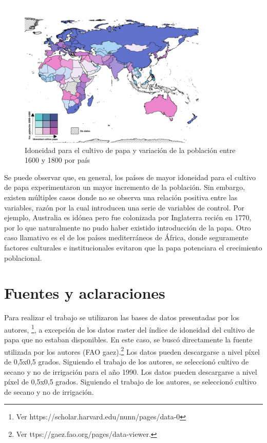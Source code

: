 \documentclass[10.5pt]{article}   %
\begin{document}
\begin{figure}[H]
\centering
\includegraphics[scale=0.6]{imgs/Map_bivariado_var_pob y papa_v2.png}
\caption{Idoneidad para el cultivo de papa y variación de la población entre 1600 y 1800 por país}
    \label{fig3}
\end{figure}

Se puede observar que, en general, los países de mayor idoneidad para el cultivo de papa experimentaron un mayor incremento de la población. Sin embargo, existen múltiples casos donde no se observa una relación positiva entre las variables, razón por la cual \cite{nunn2011potato} introducen una serie de variables de control. Por ejemplo, Australia es idónea pero fue colonizada por Inglaterra recién en 1770, por lo que naturalmente no pudo haber existido introducción de la papa. Otro caso llamativo es el de los países mediterráneos de África, donde seguramente factores culturales e institucionales evitaron que la papa potenciara el crecimiento poblacional.

\section*{Fuentes y aclaraciones}
Para realizar el trabajo se utilizaron las bases de datos presentadas por los autores, \footnote{Ver https://scholar.harvard.edu/nunn/pages/data-0}, a excepción de los datos raster del índice de idoneidad del cultivo de papa que no estaban disponibles. En este caso, se buscó directamente la fuente utilizada por los autores (FAO gaez).\footnote{Ver ttps://gaez.fao.org/pages/data-viewer.} Los datos pueden descargarse a nivel píxel de 0,5x0,5 grados. Siguiendo el trabajo de los autores, se seleccionó cultivo de secano y no de irrigación para el año 1990.
 Los datos pueden descargarse a nivel píxel de 0,5x0,5 grados. Siguiendo el trabajo de los autores, se seleccionó cultivo de secano y no de irrigación.

%
\printbibliography
    
\end{document}
